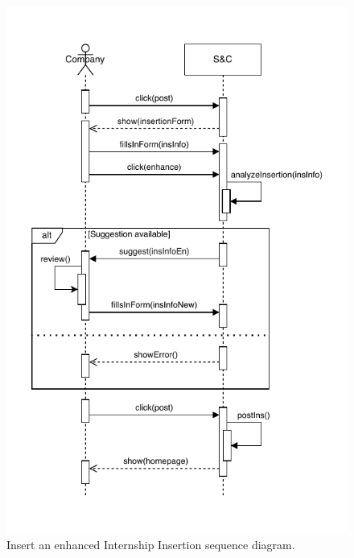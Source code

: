 \begin{figure}[H]
    \begin{center}
        \includegraphics[width=\linewidth]{Images/SequenceDiagram/InsertInternSD2.pdf}
        \caption{Insert an enhanced Internship Insertion sequence diagram.}
        \label{fig:insert_intern_seqdiag}%
    \end{center}
\end{figure}


